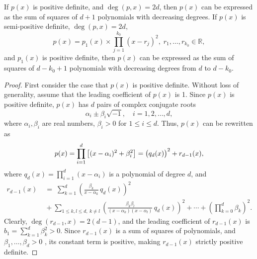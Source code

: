 \documentclass[10pt,a4paper]{amsart}
\begin{document}
\begin{theorem}
If $p(x)$ is positive definite, and $\deg(p,x)=2d$, then  $p(x)$ can be expressed as the sum of squares of $d+1$ polynomials with decreasing degrees.  
If $p(x)$ is semi-positive definite, 
$\deg(p,x)=2d$,  
$$
p(x)=p_1(x)\times 
\prod_{j=1}^{k_0}(x-r_j)^{2}, \;
r_1,\ldots,r_{k_0}\in \mathbb{R},
$$
and $p_1(x)$ is positive definite, 
then $p(x)$ can be expressed as the sum of squares of $d-k_0+1$ polynomials with decreasing degrees from $d$ to $d-k_0$.   
\label{thm-2}
\end{theorem}

\begin{proof} First consider the case that $p(x)$ is positive definite. 
Without loss of generality, assume that the leading coefficient of $p(x)$ is 1. Since $p(x)$ is positive definite, $p(x)$ has $d$ pairs of complex conjugate roots  
\[
\alpha_i\pm\beta_i\sqrt{-1}, \quad i=1,2,\ldots,d,
\]
where $\alpha_i, \beta_i$ are real numbers, $\beta_i > 0$ for $1\leq i\leq d$.  
Thus, $p(x)$ can be rewritten as  
\begin{equation}
  p(x)=\prod_{i=1}^{d} \left[(x-\alpha_i)^2+\beta_i^2\right]=
\left(q_d(x)\vphantom{x_1^2}\right)^2+r_{d-1}(x),
\label{eq-0002}
\end{equation}
where $q_d(x)=\prod_{i=1}^{d}(x-\alpha_i)$ is a polynomial of degree $d$, and  
\begin{align}
r_{d-1}(x)&\;=\;
\sum_{k=1}^{d}\left(\frac{\beta_k}{x-\alpha_k}\,q_d(x)\right)^2\nonumber \\
&\;+\sum_{1\le k,l\le {d}, \ k\neq l}\left(\frac{\beta_k \beta_l}{(x-\alpha_k)(x-\alpha_l)}\,q_d(x)\right)^2
+\cdots+ \left(\prod_{k=0}^{d}\beta_k\right)^2.
\nonumber
\end{align}
Clearly, $\deg(r_{d-1},x)\!=\!2(d-1)$, and the leading coefficient of $r_{d-1}(x)$ is 
$b_1 = \sum_{k=1}^d \beta_k^2 >0$. 
Since $r_{d-1}(x)$ is a sum of squares of polynomials, 
and $\beta_1,\ldots,\beta_d > 0$ ,  its constant term is positive, making $r_{d-1}(x)$ strictly positive definite. 


\end{proof}
\end{document}

